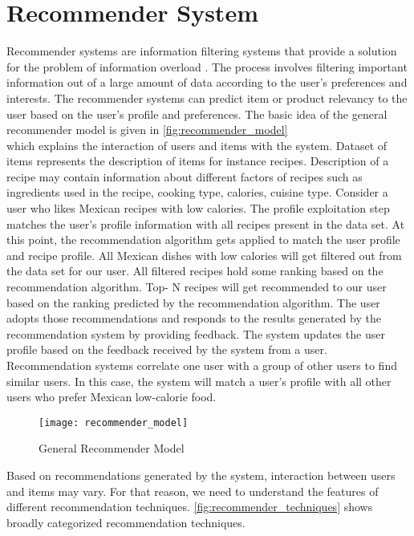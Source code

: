 \section{Recommender System}
Recommender systems are information filtering systems that provide a solution for the problem of information overload \cite{45}. The process involves filtering important information out of a large amount of data according to the user's preferences and interests. The recommender systems can predict item or product relevancy to the user based on the user's profile and preferences. The basic idea of the general recommender model is given in \autoref{fig:recommender_model} \\ which explains the interaction of users and items with the system. Dataset of items represents the description of items for instance recipes. Description of a recipe may contain information about different factors of recipes such as ingredients used in the recipe, cooking type, calories, cuisine type. Consider a user who likes Mexican recipes with low calories. The profile exploitation step matches the user's profile information with all recipes present in the data set. At this point, the recommendation algorithm gets applied to match the user profile and recipe profile. All Mexican dishes with low calories will get filtered out from the data set for our user. All filtered recipes hold some ranking based on the recommendation algorithm. Top- N recipes will get recommended to our user based on the ranking predicted by the recommendation algorithm. The user adopts those recommendations and responds to the results generated by the recommendation system by providing feedback. The system updates the user profile based on the feedback received by the system from a user. Recommendation systems correlate one user with a group of other users to find similar users. In this case, the system will match a user's profile with all other users who prefer Mexican low-calorie food. 

\begin{figure}[H]
	\centering
	\texttt{[image: recommender\_model]}
	\caption{General Recommender Model \cite{3}}
	\label{fig:recommender_model}
\end{figure}

\noindent Based on recommendations generated by the system, interaction between users and items may vary. For that reason, we need to understand the features of different recommendation techniques. \autoref{fig:recommender_techniques} shows broadly categorized recommendation techniques.

